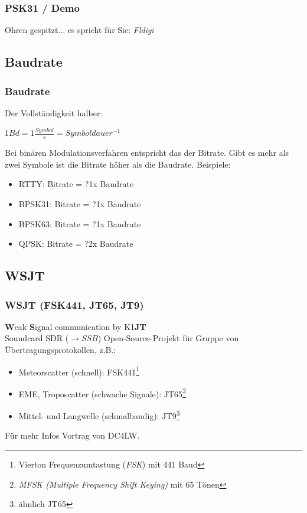 \begin{frame}
  \frametitle{PSK31 / Demo}

  \Large{Ohren gespitzt... es spricht für Sie: \emph{Fldigi}}

\end{frame}

\subsection{Baudrate}

\begin{frame}
  \frametitle{Baudrate}

  Der Vollständigkeit halber: \\[2em]

  \begin{center}
    $1 Bd = 1 \frac{Symbol}{s} = Symboldauer^{-1}$
  \end{center}

  Bei binären Modulationsverfahren entspricht das der Bitrate. Gibt es mehr
  als zwei Symbole ist die Bitrate höher als die Baudrate. Beispiele:

  \begin{itemize}
    \item RTTY: Bitrate = ?1x Baudrate
    \item BPSK31: Bitrate = ?1x Baudrate
    \item BPSK63: Bitrate = ?1x Baudrate
    \item QPSK: Bitrate = ?2x Baudrate
  \end{itemize}

\end{frame}

\subsection{WSJT}

\begin{frame}
  \frametitle{WSJT (FSK441, JT65, JT9)}

  \textbf{W}eak \textbf{S}ignal communication by K1\textbf{JT} \\[2em]

  Soundcard SDR ($\rightarrow SSB$) Open-Source-Projekt für Gruppe von
  Übertragungsprotokollen, z.B.:

  \begin{itemize}
    \item Meteorscatter (schnell): FSK441\footnote{Vierton Frequenzumtastung
      (\emph{FSK}) mit 441 Baud}
    \item EME, Troposcatter (schwache Signale): JT65\footnote{\emph{MFSK
      (Multiple Frequency Shift Keying)} mit 65 Tönen}
    \item Mittel- und Langwelle (schmalbandig): JT9\footnote{ähnlich JT65}
  \end{itemize}

  \bigskip

  Für mehr Infos Vortrag von DC4LW\hyperlink{refs}{\cite{wsjt}}.

\end{frame}


